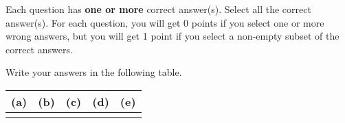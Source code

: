 Each question has \textbf{one or more} correct answer(s). Select all the correct answer(s). For each question, you will get 0 points if you select one or more wrong answers, but you will get 1 point if you select a non-empty subset of the correct answers.

Write your answers in the following table.

\begin{table}[htbp]
    \centering
    \begin{tabular}{|p{2cm}|p{2cm}|p{2cm}|p{2cm}|p{2cm}|}
        \hline
        (a) & (b) & (c) & (d) & (e)\\
        \hline
		   &  &  &    &  \\
        \hline
    \end{tabular}
\end{table}


